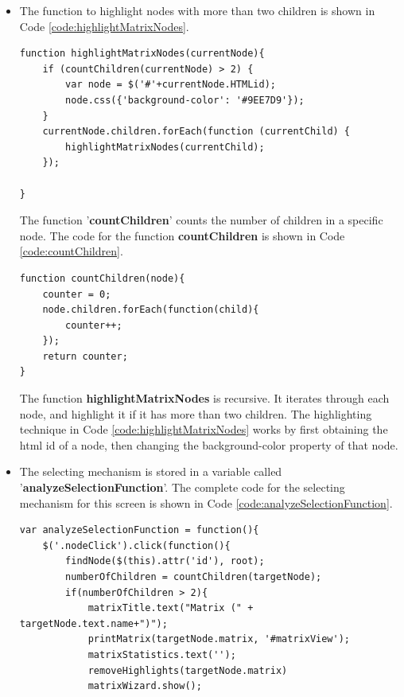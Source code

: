 \documentclass[11pt]{article} %
\begin{document}
\begin{itemize}

\item The function to highlight nodes with more than two children is shown in Code \ref{code:highlightMatrixNodes}.

\noindent
\begin{minipage}[c]{\linewidth}
\begin{lstlisting}[basicstyle=\scriptsize, tabsize=4, frame=single, caption=Highlighting Matrix Nodes (nodes with more than 2 children), label=code:highlightMatrixNodes]
function highlightMatrixNodes(currentNode){
	if (countChildren(currentNode) > 2) {
		var node = $('#'+currentNode.HTMLid);
		node.css({'background-color': '#9EE7D9'});
    }
	currentNode.children.forEach(function (currentChild) {            
		highlightMatrixNodes(currentChild);
	});
    
}

\end{lstlisting}
\end{minipage}

\noindent
The function '\textbf{countChildren}' counts the number of children in a specific node. The code for the function \textbf{countChildren} is shown in Code \ref{code:countChildren}.

\noindent
\begin{minipage}[c]{\linewidth}
\begin{lstlisting}[basicstyle=\scriptsize, tabsize=4, frame=single, caption=countChildren function, label=code:countChildren]
function countChildren(node){
	counter = 0;
	node.children.forEach(function(child){
		counter++;
	});
	return counter;
}
\end{lstlisting}
\end{minipage}


\noindent
The function \textbf{highlightMatrixNodes} is recursive. It iterates through each node, and highlight it if it has more than two children. The highlighting technique in Code \ref{code:highlightMatrixNodes} works by first obtaining the html id of a node, then changing the background-color property of that node.


\item The selecting mechanism is stored in a variable called '\textbf{analyzeSelectionFunction}'. The complete code for the selecting mechanism for this screen is shown in Code \ref{code:analyzeSelectionFunction}.

\noindent
\begin{minipage}[c]{\linewidth}
\begin{lstlisting}[basicstyle=\scriptsize, tabsize=4, frame=single, caption=analyzeSelectionFunction function, label=code:analyzeSelectionFunction]
var analyzeSelectionFunction = function(){
	$('.nodeClick').click(function(){
		findNode($(this).attr('id'), root);
		numberOfChildren = countChildren(targetNode);
		if(numberOfChildren > 2){
			matrixTitle.text("Matrix (" + targetNode.text.name+")");
			printMatrix(targetNode.matrix, '#matrixView');
			matrixStatistics.text('');
			removeHighlights(targetNode.matrix)
			matrixWizard.show();
			

\end{lstlisting}
\end{minipage}
\end{itemize}
\end{document}
